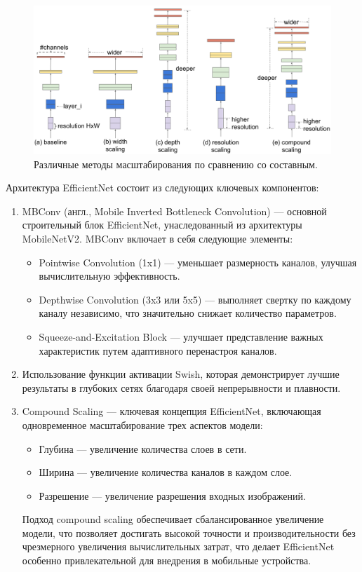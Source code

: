 \documentclass[a4paper,12pt]{extarticle}
\begin{document}
\begin{figure}[ht]
	\centering
	\includegraphics[scale=0.3]{scaling_method.png}
	\caption{Различные методы масштабирования по сравнению со составным\cite{efficientnet}.}
	\label{fig:scaling_method}
\end{figure}

Архитектура EfficientNet состоит из следующих ключевых компонентов:
\begin{enumerate}[label=\arabic*.]
	\item MBConv (англ., Mobile Inverted Bottleneck Convolution) — основной строительный блок EfficientNet, унаследованный из архитектуры MobileNetV2. MBConv включает в себя следующие элементы:
	\begin{itemize}
		\item Pointwise Convolution (1x1) — уменьшает размерность каналов, улучшая вычислительную эффективность.
		\item Depthwise Convolution (3x3 или 5x5) — выполняет свертку по каждому каналу независимо, что значительно снижает количество параметров.
		\item Squeeze-and-Excitation Block — улучшает представление важных характеристик путем адаптивного перенастроя каналов.
	\end{itemize}
	\item Использование функции активации Swish, которая демонстрирует лучшие результаты в глубоких сетях благодаря своей непрерывности и плавности.
	\item Compound Scaling — ключевая концепция EfficientNet, включающая одновременное масштабирование трех аспектов модели:
	\begin{itemize}
		\item Глубина — увеличение количества слоев в сети.
		\item Ширина — увеличение количества каналов в каждом слое.
		\item Разрешение — увеличение разрешения входных изображений.
	\end{itemize}
	Подход compound scaling обеспечивает сбалансированное увеличение модели, что позволяет достигать высокой точности и производительности без чрезмерного увеличения вычислительных затрат, что делает EfficientNet особенно привлекательной для внедрения в мобильные устройства.
\end{enumerate}
\end{document}
